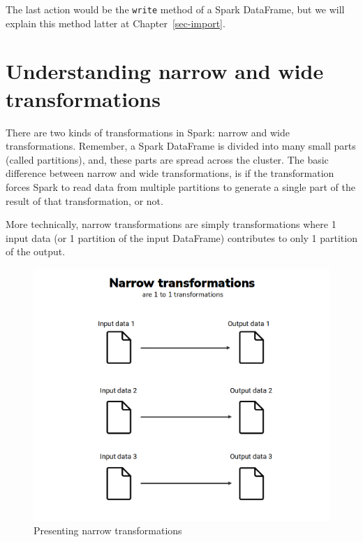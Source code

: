 \documentclass[
  11pt,
  letterpaper,
  DIV=11,
  numbers=noendperiod]{scrreprt}
\begin{document}
The last action would be the \texttt{write} method of a Spark DataFrame,
but we will explain this method latter at Chapter~\ref{sec-import}.

\hypertarget{sec-narrow-wide}{%
\section{Understanding narrow and wide
transformations}\label{sec-narrow-wide}}

There are two kinds of transformations in Spark: narrow and wide
transformations. Remember, a Spark DataFrame is divided into many small
parts (called partitions), and, these parts are spread across the
cluster. The basic difference between narrow and wide transformations,
is if the transformation forces Spark to read data from multiple
partitions to generate a single part of the result of that
transformation, or not.

More technically, narrow transformations are simply transformations
where 1 input data (or 1 partition of the input DataFrame) contributes
to only 1 partition of the output.

\begin{figure}

{\centering \includegraphics{Chapters/../Figures/narrow-transformations.png}

}

\caption{\label{fig-narrow-transformations}Presenting narrow
transformations}

\end{figure}
\end{document}
